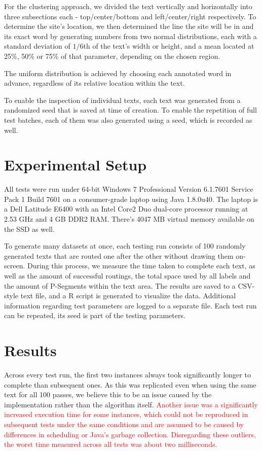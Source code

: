 \documentclass[11pt,a4paper]{vutinfth}
\newcommand{\change}[1]{\textcolor{red}{#1}}
\begin{document}
For the clustering approach, we divided the text vertically and horizontally into three subsections each - top/center/bottom and left/center/right respectively. To determine the site's location, we then determined the line the site will be in and its exact word by generating numbers from two normal distributions, each with a standard deviation of $1/6$th of the text's width or height, and a mean located at 25\%, 50\% or 75\% of that parameter, depending on the chosen region.

The uniform distribution is achieved by choosing each annotated word in advance, regardless of its relative location within the text.

To enable the inspection of individual texts, each text was generated from a randomized seed that is saved at time of creation. To enable the repetition of full test batches, each of them was also generated using a seed, which is recorded as well.

\section{Experimental Setup}

All tests were run under 64-bit Windows 7 Professional Version 6.1.7601 Service Pack 1 Build 7601 on a consumer-grade laptop using Java 1.8.0u40. The laptop is a Dell Latitude E6400 with an Intel Core2 Duo dual-core processor running at 2.53 GHz and 4 GB DDR2 RAM. There's 4047 MB virtual memory available on the SSD as well.

To generate many datasets at once, each testing run consists of 100 randomly generated texts that are routed one after the other without drawing them on-screen. During this process, we measure the time taken to complete each text, as well as the amount of successful routings, the total space used by all labels and the amount of P-Segments within the text area.
The results are saved to a CSV-style text file, and a R script is generated to visualize the data. Additional information regarding test parameters are logged to a separate file.
Each test run can be repeated, its seed is part of the testing parameters.

\section{Results}

Across every test run, the first two instances always took significantly longer to complete than subsequent ones. As this was replicated even when using the same text for all 100 passes, we believe this to be an issue caused by the implementation rather than the algorithm itself. 
\change{Another issue was a significantly increased execution time for some instances, which could not be reproduced in subsequent tests under the same conditions and are assumed to be caused by differences in scheduling or Java's garbage collection. Disregarding these outliers, the worst time measured across all tests was about two milliseconds.}%
\end{document}

